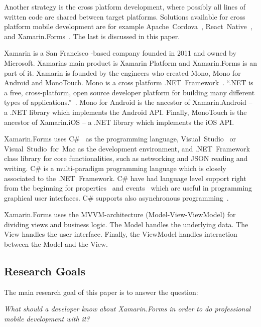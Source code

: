 \documentclass[conference]{IEEEtran}
\begin{document}
Another strategy is the cross platform development, where possibly all lines of written code are shared between target platforms. Solutions available for cross platform mobile development are for example 
Apache~Cordova~\cite{cordova}, React~Native~\cite{react}, and Xamarin.Forms~\cite{xamarin.forms}. The last is discussed in this paper.

Xamarin is a San Francisco -based company founded in 2011 and owned by Microsoft. Xamarins main product is Xamarin Platform and Xamarin.Forms is an part of it. Xamarin is founded by the engineers who created Mono, Mono for Android and MonoTouch. Mono is a cross platform .NET~Framework~\cite{mono}. ``.NET is a free, cross-platform, open source developer platform for building many different types of applications.''~\cite{dotnet}. Mono for Android is the ancestor of Xamarin.Android -- a .NET library which implements the Android API. Finally, MonoTouch is the ancestor of Xamarin.iOS -- a .NET library which implements the iOS API.

Xamarin.Forms uses C\#~\cite{csharp} as the programming language, Visual~Studio~\cite{vs} or Visual~Studio~for~Mac as the development environment, and .NET~Framework class library for core functionalities, such as networking and JSON reading and writing. C\# is a multi-paradigm programming language which is closely associated to the .NET~Framework. C\# have had language level support right from the beginning for properties~\cite{properties} and events~\cite{events} which are useful in programming graphical user interfaces. C\# supports also asynchronous programming~\cite{asyncro}.

Xamarin.Forms uses the MVVM-architecture (Model-View-ViewModel) for dividing views and business logic. The Model handles the underlying data. The View handles the user interface. Finally, the ViewModel handles interaction between the Model and the View.

\subsection*{Research Goals}

The main research goal of this paper is to answer the question:

\emph{What should a developer know about Xamarin.Forms in order to do professional mobile development with it?}

\nocite{xamarin}


\end{document}
